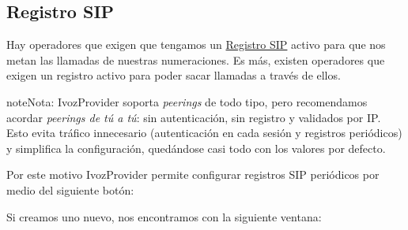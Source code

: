 \documentclass[letterpaper,10pt,spanish]{sphinxmanual}
\begin{document}
\subsection{Registro SIP}
\label{external_incoming_calls/peering_contracts:sip-register}
Hay operadores que exigen que tengamos un \href{https://tools.ietf.org/html/rfc3261\#section-10}{Registro SIP} activo para que nos metan las llamadas de nuestras numeraciones. Es más, existen operadores que exigen un registro activo para poder sacar llamadas a través de ellos.

\begin{notice}{note}{Nota:}
IvozProvider soporta \emph{peerings} de todo tipo, pero recomendamos acordar \emph{peerings de tú a tú}: sin autenticación, sin registro y validados por IP. Esto evita tráfico innecesario (autenticación en cada sesión y registros periódicos) y simplifica la configuración, quedándose casi todo con los valores por defecto.
\end{notice}

Por este motivo IvozProvider permite configurar registros SIP periódicos por medio del siguiente botón:

\noindent{}

Si creamos uno nuevo, nos encontramos con la siguiente ventana:
\end{document}
